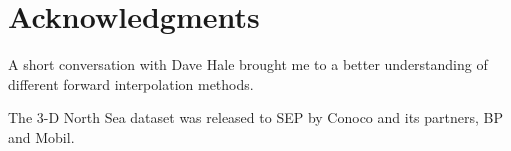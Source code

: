 \section{Acknowledgments}

A short conversation with Dave Hale brought me to a better
understanding of different forward interpolation methods.
\par
The 3-D North Sea dataset was released to SEP by Conoco and its
partners, BP and Mobil.





%
%
